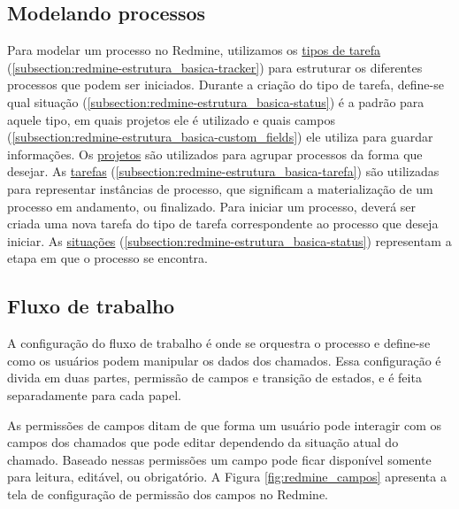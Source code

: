 \subsection{Modelando processos}\label{subsection:redmine-automatizar_processo-criacao}

Para modelar um processo no Redmine, utilizamos os \underline{tipos de tarefa} (\ref{subsection:redmine-estrutura_basica-tracker}) para estruturar os diferentes processos que podem ser iniciados. Durante a criação do tipo de tarefa, define-se qual situação (\ref{subsection:redmine-estrutura_basica-status}) é a padrão para aquele tipo, em quais projetos ele é utilizado e quais campos (\ref{subsection:redmine-estrutura_basica-custom_fields}) ele utiliza para guardar informações. Os \underline{projetos} são utilizados para agrupar processos da forma que desejar. As \underline{tarefas} (\ref{subsection:redmine-estrutura_basica-tarefa}) são utilizadas para representar instâncias de processo, que significam a materialização de um processo em andamento, ou finalizado. Para iniciar um processo, deverá ser criada uma nova tarefa do tipo de tarefa correspondente ao processo que deseja iniciar. As \underline{situações} (\ref{subsection:redmine-estrutura_basica-status}) representam a etapa em que o processo se encontra. 

\subsection{Fluxo de trabalho}\label{subsection:redmine-fluxo_de_trabalho}

A configuração do fluxo de trabalho é onde se orquestra o processo e define-se como os usuários podem manipular os dados dos chamados. Essa configuração é divida em duas partes, permissão de campos e transição de estados, e é feita separadamente para cada papel.

As permissões de campos ditam de que forma um usuário pode interagir com os campos dos chamados que pode editar dependendo da situação atual do chamado. Baseado nessas permissões um campo pode ficar disponível somente para leitura, editável, ou obrigatório. A Figura \ref{fig:redmine_campos} apresenta a tela de configuração de permissão dos campos no Redmine.

